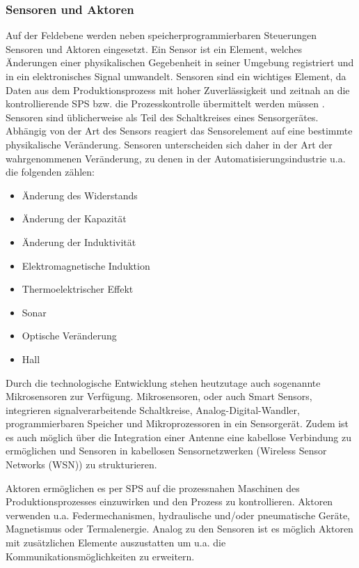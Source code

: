 \subsubsection{Sensoren und Aktoren}
Auf der Feldebene werden neben speicherprogrammierbaren Steuerungen Sensoren und Aktoren eingesetzt. 
Ein Sensor ist ein Element, welches Änderungen einer physikalischen Gegebenheit in seiner Umgebung registriert und in ein elektronisches Signal umwandelt. Sensoren sind ein wichtiges Element, da Daten aus dem Produktionsprozess mit hoher Zuverlässigkeit und zeitnah an die kontrollierende SPS bzw. die Prozesskontrolle übermittelt werden müssen \citep{Jeong2009}. Sensoren sind üblicherweise als Teil des Schaltkreises eines Sensorgerätes. Abhängig von der Art des Sensors reagiert das Sensorelement auf eine bestimmte physikalische Veränderung. Sensoren unterscheiden sich daher in der Art der wahrgenommenen  Veränderung, zu denen in der Automatisierungsindustrie u.a. die folgenden zählen:
\begin{itemize}
\item Änderung des Widerstands
\item Änderung der Kapazität
\item Änderung der Induktivität
\item Elektromagnetische Induktion
\item Thermoelektrischer Effekt
\item Sonar
\item Optische Veränderung
\item Hall
\end{itemize}

Durch die technologische Entwicklung stehen heutzutage auch sogenannte Mikrosensoren zur Verfügung. Mikrosensoren, oder auch \glqq Smart Sensors\grqq , integrieren signalverarbeitende Schaltkreise, Analog-Digital-Wandler, programmierbaren Speicher und Mikroprozessoren in ein Sensorgerät. Zudem ist es auch möglich über die Integration einer Antenne eine kabellose Verbindung zu ermöglichen und Sensoren in kabellosen Sensornetzwerken (Wireless Sensor Networks (WSN)) zu strukturieren\citep{Jeong2009}.

Aktoren ermöglichen es per SPS auf die prozessnahen Maschinen des Produktionsprozesses einzuwirken und den Prozess zu kontrollieren. Aktoren verwenden u.a. Federmechanismen, hydraulische und/oder pneumatische Geräte, Magnetismus oder Termalenergie. Analog zu den Sensoren ist es möglich Aktoren mit zusätzlichen Elemente auszustatten um u.a. die Kommunikationsmöglichkeiten zu erweitern\citep{Jeong2009}.

